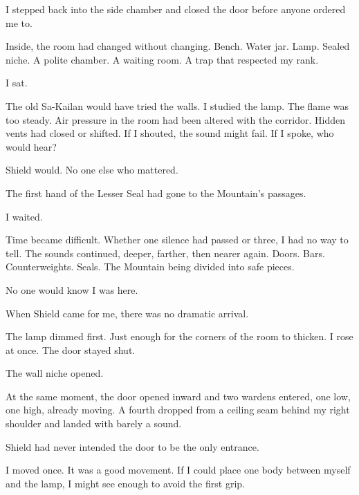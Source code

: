 \ornament

I stepped back into the side chamber and closed the door before anyone ordered me to.\par

Inside, the room had changed without changing. Bench. Water jar. Lamp. Sealed niche. A polite chamber. A waiting room. A trap that respected my rank.\par

I sat.\par

The old Sa-Kailan would have tried the walls. I studied the lamp. The flame was too steady. Air pressure in the room had been altered with the corridor. Hidden vents had closed or shifted. If I shouted, the sound might fail. If I spoke, who would hear?\par

Shield would. No one else who mattered.\par

The first hand of the Lesser Seal had gone to the Mountain's passages.\par

I waited.\par

Time became difficult. Whether one silence had passed or three, I had no way to tell. The sounds continued, deeper, farther, then nearer again. Doors. Bars. Counterweights. Seals. The Mountain being divided into safe pieces.\par

No one would know I was here.\par

When Shield came for me, there was no dramatic arrival.\par

The lamp dimmed first. Just enough for the corners of the room to thicken. I rose at once. The door stayed shut.\par

The wall niche opened.\par

At the same moment, the door opened inward and two wardens entered, one low, one high, already moving. A fourth dropped from a ceiling seam behind my right shoulder and landed with barely a sound.\par

Shield had never intended the door to be the only entrance.\par

I moved once. It was a good movement. If I could place one body between myself and the lamp, I might see enough to avoid the first grip.\par

